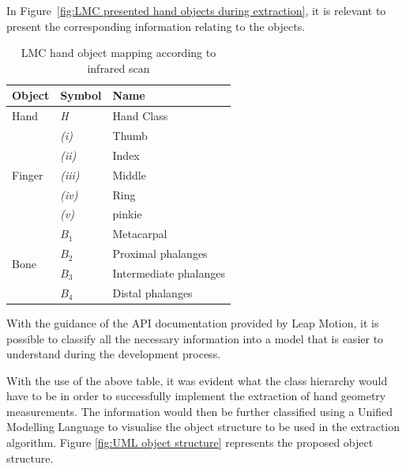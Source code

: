 In Figure~\ref{fig:LMC presented hand objects during extraction}, it is relevant to present the corresponding information relating to the objects.



    \begin{table}[h!]
    \caption{LMC hand object mapping according to infrared scan}
    \centering
     \begin{tabular}{|p{} | p{}| p{}|} 
     \hline
    	\textbf{Object} & \textbf{Symbol} & \textbf{Name} \\ [1ex] 
     \hline\hline 
     Hand & \textit{H} & Hand Class  \\
     \hline 
     \multirow{5}{*}{Finger} & \textit{(i)} & Thumb \\

            & \textit{(ii)} & Index     \\
     
            & \textit{(iii)} & Middle     \\
     
            & \textit{(iv)} & Ring     \\
     
            & \textit{(v)} & pinkie      \\
    \hline        
    \multirow{4}{*}{Bone} & \(B_1\) & Metacarpal\\
     
            & \(B_2\) & Proximal phalanges     \\
     
            & \(B_3\) & Intermediate phalanges     \\
     
            & \(B_4\) & Distal phalanges     \\
     \hline
     \end{tabular}
    \end{table}
    
With the guidance of the API documentation provided by Leap Motion, it is possible to classify all the necessary information into a model that is easier to understand during the development process. 

With the use of the above table, it was evident what the class hierarchy would have to be in order to successfully implement the extraction of hand geometry measurements. The information would then be further classified using a Unified Modelling Language to visualise the object structure to be used in the extraction algorithm. Figure \ref{fig:UML object structure} represents the proposed object structure.

